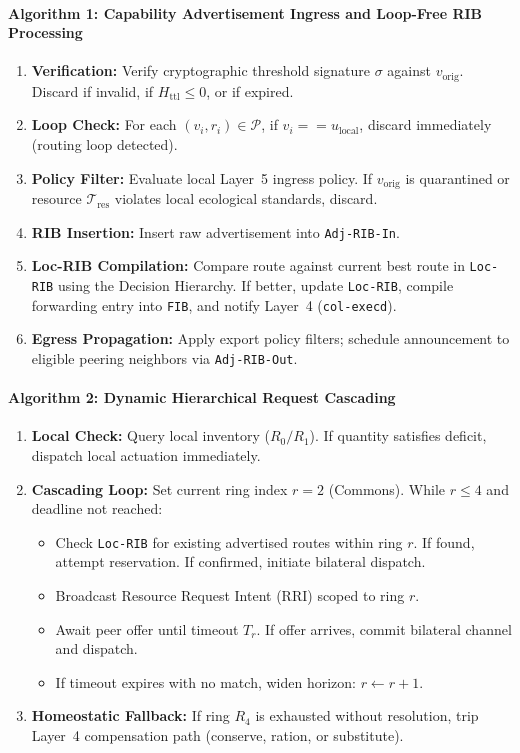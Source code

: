 \paragraph{Algorithm 1: Capability Advertisement Ingress and Loop-Free RIB Processing}
\begin{enumerate}
  \item \textbf{Verification:} Verify cryptographic threshold signature $\sigma$ against $v_{\mathrm{orig}}$. Discard if invalid, if $H_{\mathrm{ttl}} \le 0$, or if expired.
  \item \textbf{Loop Check:} For each $(v_i, r_i) \in \mathcal{P}$, if $v_i == u_{\mathrm{local}}$, discard immediately (routing loop detected).
  \item \textbf{Policy Filter:} Evaluate local Layer~5 ingress policy. If $v_{\mathrm{orig}}$ is quarantined or resource $\mathcal{T}_{\mathrm{res}}$ violates local ecological standards, discard.
  \item \textbf{RIB Insertion:} Insert raw advertisement into \texttt{Adj-RIB-In}.
  \item \textbf{Loc-RIB Compilation:} Compare route against current best route in \texttt{Loc-RIB} using the Decision Hierarchy. If better, update \texttt{Loc-RIB}, compile forwarding entry into \texttt{FIB}, and notify Layer~4 (\texttt{col-execd}).
  \item \textbf{Egress Propagation:} Apply export policy filters; schedule announcement to eligible peering neighbors via \texttt{Adj-RIB-Out}.
\end{enumerate}

\paragraph{Algorithm 2: Dynamic Hierarchical Request Cascading}
\begin{enumerate}
  \item \textbf{Local Check:} Query local inventory ($R_0 / R_1$). If quantity satisfies deficit, dispatch local actuation immediately.
  \item \textbf{Cascading Loop:} Set current ring index $r = 2$ (Commons). While $r \le 4$ and deadline not reached:
  \begin{itemize}
    \item Check \texttt{Loc-RIB} for existing advertised routes within ring $r$. If found, attempt reservation. If confirmed, initiate bilateral dispatch.
    \item Broadcast Resource Request Intent (RRI) scoped to ring $r$.
    \item Await peer offer until timeout $T_r$. If offer arrives, commit bilateral channel and dispatch.
    \item If timeout expires with no match, widen horizon: $r \gets r + 1$.
  \end{itemize}
  \item \textbf{Homeostatic Fallback:} If ring $R_4$ is exhausted without resolution, trip Layer~4 compensation path (conserve, ration, or substitute).
\end{enumerate}

